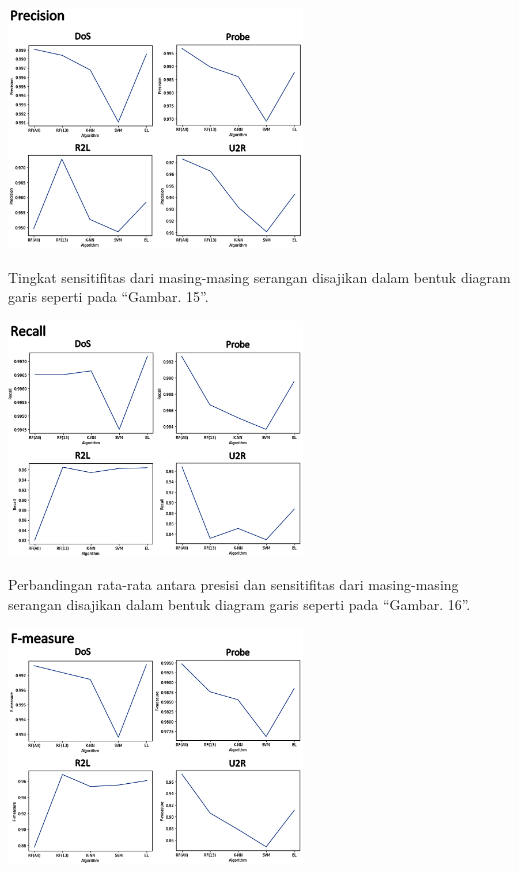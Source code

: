 \documentclass[conference]{IEEEtran}
\begin{document}
\noindent \begin{minipage}{\linewidth}
\centerline{\includegraphics[width=78mm]{Gambar/Gbr013.jpg}}
\label{fig14}
\end{minipage}
\vspace{6pt}

\noindent Tingkat sensitifitas dari masing-masing serangan disajikan dalam bentuk diagram garis seperti pada ``Gambar. 15''.\vspace{6pt}

\noindent \begin{minipage}{\linewidth}
\centerline{\includegraphics[width=78mm]{Gambar/Gbr014.jpg}}
\label{fig15}
\end{minipage}
\vspace{6pt}

\noindent Perbandingan rata-rata antara presisi dan sensitifitas dari masing-masing serangan disajikan dalam bentuk diagram garis seperti pada ``Gambar. 16''.\vspace{6pt}

\noindent \begin{minipage}{\linewidth}
\centerline{\includegraphics[width=78mm]{Gambar/Gbr015.jpg}}
\label{fig16}
\end{minipage}
\vspace{6pt}
\end{document}
